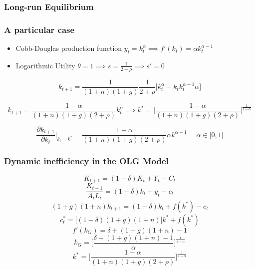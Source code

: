 \subsubsection{Long-run Equilibrium}

\subsubsection{A particular case}
\begin{itemize}
    \item Cobb-Douglas production function $y_{t}=k_{t}^{\alpha} \implies f'(k_{t})=\alpha k_{t}^{\alpha-1}$
    \item Logarithmic Utility $\theta=1 \implies s=\frac{1}{2+\rho} \implies s'=0$
\end{itemize}

\begin{equation*}
   k_{t+1}= \frac{1}{(1+n)(1+g)}\frac{1}{2+\rho}\bigg[ k_{t}^\alpha-k_{t}k_{t}^{\alpha-1}\alpha \bigg]
\end{equation*}

\begin{equation*}
    k_{t+1}=\frac{1-\alpha}{(1+n)(1+g)(2+\rho)}k_{t}^{\alpha} \implies k^{*}=\bigg[\frac{1-\alpha}{(1+n)(1+g)(2+\rho)} \bigg]^{\frac{1}{1-\alpha}}
\end{equation*}

\begin{equation*}
    \frac{\partial k_{t+1}}{\partial k_{t}} \bigg \rvert_{k_{t}=k^*}=\frac{1-\alpha}{(1+n)(1+g)(2+\rho)}\alpha k^{\alpha-1}=\alpha \in ]0, 1[
\end{equation*}

\subsubsection{Dynamic inefficiency in the OLG Model}
\begin{equation*}
    K_{t+1}=(1-\delta)K_{t}+Y_{t}-C_{t}
\end{equation*}
\begin{equation*}
    \frac{K_{t+1}}{A_{t}L_{t}}=(1-\delta)k_{t}+y_{t}-c_{t}
\end{equation*}
\begin{equation*}
    (1+g)(1+n)k_{t+1}=(1-\delta)k_{t}+f(k^*)-c_{t}
\end{equation*}
\begin{equation*}
    c_{t}^*=\big[(1-\delta)(1+g)(1+n)\big]k^{*}+f(k^*)
\end{equation*}
\begin{equation*}
    f'(k_{G})=\delta+(1+g)(1+n)-1
\end{equation*}
\begin{equation}
    k_{G}=\bigg[\frac{\delta+(1+g)(1+n)-1}{\alpha}\bigg]^{\frac{1}{1-\alpha}}
\end{equation}
\begin{equation}
    k^*=\bigg[ \frac{1-\alpha}{(1+n)(1+g)(2+\rho)} \bigg]^{\frac{1}{1-\alpha}}
\end{equation}

